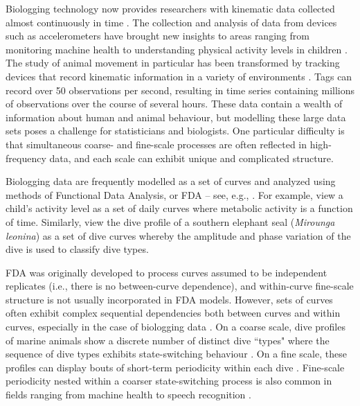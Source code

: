 
Biologging technology now provides researchers with kinematic data collected almost continuously in time \citep{Hooten:2017}.
The collection and analysis of data from devices such as accelerometers have brought new insights to areas ranging from monitoring machine health \citep{Getman:2009} to understanding physical activity levels in children \citep{Morris:2007}. The study of animal movement in particular has been transformed by tracking devices that record kinematic information in a variety of environments \citep{Borger:2020,Dot:2016b}. Tags can record over 50 observations per second, resulting in time series containing millions of observations over the course of several hours. 
These data contain a wealth of information about human and animal behaviour, but modelling these large data sets poses a challenge for statisticians and biologists. One particular difficulty is that simultaneous coarse- and fine-scale processes are often reflected in high-frequency data, and each scale can exhibit unique and complicated structure.

Biologging data are frequently modelled as a set of curves and analyzed using methods of Functional Data Analysis, or FDA -- see, e.g., \citet{Ramsay:2005}. For example, \citet{Morris:2007} view a child's activity level as a set of daily curves where metabolic activity is a function of time. Similarly, \citet{Fu:2017} view the dive profile of a southern elephant seal (\textit{Mirounga leonina}) as a set of dive curves whereby the amplitude and phase variation of the dive is used to classify dive types.

FDA was originally developed to process curves assumed to be independent replicates (i.e., there is no between-curve dependence), and within-curve fine-scale structure is not usually incorporated in FDA models. However, sets of curves often exhibit complex sequential dependencies both between curves and within curves, especially in the case of biologging data \citep{Barajas:2017}.
On a coarse scale, dive profiles of marine animals show a discrete number of distinct dive ``types" where the sequence of dive types exhibits state-switching behaviour \citep{Tennessen:2019b}. On a fine scale, these profiles can display bouts of short-term periodicity within each dive \citep{Adam:2019}. Fine-scale periodicity nested within a coarser state-switching process is also common in fields ranging from machine health \citep{Xin:2018,Lucero:2019} to speech recognition \citep{Juang:1991}. 

